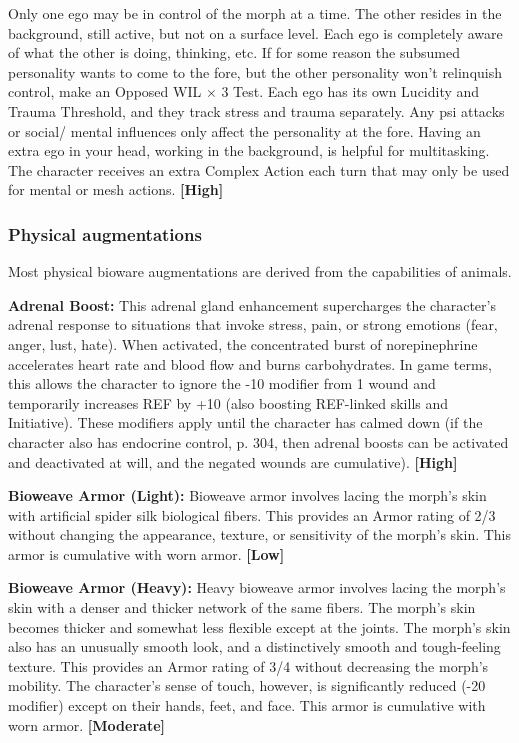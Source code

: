 Only one ego may be in control of the morph at a time. The other resides in the background, still active, but not on a surface level. Each ego is completely aware of what the other is doing, thinking, etc. If for some reason the subsumed personality wants to come to the fore, but the other personality won’t relinquish control, make an Opposed WIL $\times$ 3 Test. Each ego has its own Lucidity and Trauma Threshold, and they track stress and trauma separately. Any psi attacks or social/ mental influences only affect the personality at the fore. Having an extra ego in your head, working in the background, is helpful for multitasking. The character receives an extra Complex Action each turn that may only be used for mental or mesh actions. \textbf{[High]} 

\subsubsection{Physical augmentations} 

Most physical bioware augmentations are derived from the capabilities of animals. 

\textbf{Adrenal Boost:} This adrenal gland enhancement supercharges the character’s adrenal response to situations that invoke stress, pain, or strong emotions (fear, anger, lust, hate). When activated, the concentrated burst of norepinephrine accelerates heart rate and blood flow and burns carbohydrates. In game terms, this allows the character to ignore the -10 modifier from 1 wound and temporarily increases REF by +10 (also boosting REF-linked skills and Initiative). These modifiers apply until the character has calmed down (if the character also has endocrine control, p. 304, then adrenal boosts can be activated and deactivated at will, and the negated wounds are cumulative). \textbf{[High]} 

\textbf{Bioweave Armor (Light):} Bioweave armor involves lacing the morph’s skin with artificial spider silk biological fibers. This provides an Armor rating of 2/3 without changing the appearance, texture, or sensitivity of the morph’s skin. This armor is cumulative with worn armor. \textbf{[Low]} 

\textbf{Bioweave Armor (Heavy):} Heavy bioweave armor involves lacing the morph’s skin with a denser and thicker network of the same fibers. The morph’s skin becomes thicker and somewhat less flexible except at the joints. The morph’s skin also has an unusually smooth look, and a distinctively smooth and tough-feeling texture. This provides an Armor rating of 3/4 without decreasing the morph’s mobility. The character’s sense of touch, however, is significantly reduced (-20 modifier) except on their hands, feet, and face. This armor is cumulative with worn armor. \textbf{[Moderate]} 

